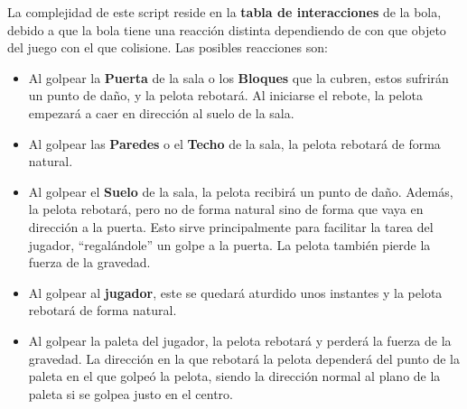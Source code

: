 La complejidad de este script reside en la \textbf{tabla de interacciones} de la bola, debido a que la bola tiene una reacción distinta dependiendo de con que objeto del juego con el que colisione. Las posibles reacciones son:
\begin{itemize}
	\item Al golpear la \textbf{Puerta} de la sala o los \textbf{Bloques} que la cubren, estos sufrirán un punto de daño, y la pelota rebotará. Al iniciarse el rebote, la pelota empezará a caer en dirección al suelo de la sala.
	\item Al golpear las \textbf{Paredes} o el \textbf{Techo} de la sala, la pelota rebotará de forma natural.
	\item Al golpear el \textbf{Suelo} de la sala, la pelota recibirá un punto de daño. Además, la pelota rebotará, pero no de forma natural sino de forma que vaya en dirección a la puerta. Esto sirve principalmente para facilitar la tarea del jugador, ``regalándole'' un golpe a la puerta. La pelota también pierde la fuerza de la gravedad.
	\item Al golpear al \textbf{jugador}, este se quedará aturdido unos instantes y la pelota rebotará de forma natural.
	\item Al golpear la paleta del jugador, la pelota rebotará y perderá la fuerza de la gravedad. La dirección en la que rebotará la pelota dependerá del punto de la paleta en el que golpeó la pelota, siendo la dirección normal al plano de la paleta si se golpea justo en el centro.
\end{itemize}
